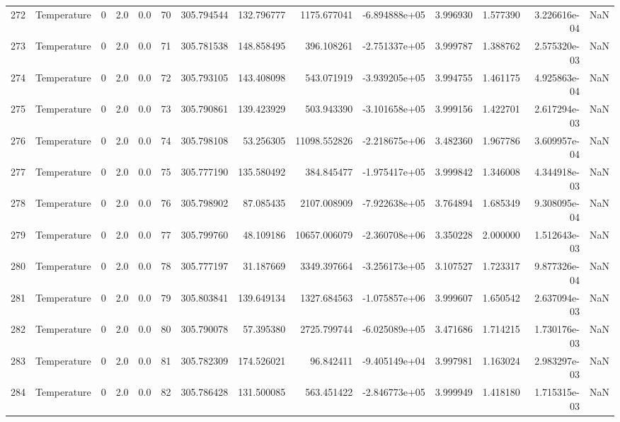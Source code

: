 \begin{tabular}{llrrrrrrrrrrrr}
272 &  Temperature &       0 &  2.0 &  0.0 &   70 &  305.794544 &   132.796777 &    1175.677041 & -6.894888e+05 &  3.996930 &  1.577390 &  3.226616e-04 &      NaN \\
273 &  Temperature &       0 &  2.0 &  0.0 &   71 &  305.781538 &   148.858495 &     396.108261 & -2.751337e+05 &  3.999787 &  1.388762 &  2.575320e-03 &      NaN \\
274 &  Temperature &       0 &  2.0 &  0.0 &   72 &  305.793105 &   143.408098 &     543.071919 & -3.939205e+05 &  3.994755 &  1.461175 &  4.925863e-04 &      NaN \\
275 &  Temperature &       0 &  2.0 &  0.0 &   73 &  305.790861 &   139.423929 &     503.943390 & -3.101658e+05 &  3.999156 &  1.422701 &  2.617294e-03 &      NaN \\
276 &  Temperature &       0 &  2.0 &  0.0 &   74 &  305.798108 &    53.256305 &   11098.552826 & -2.218675e+06 &  3.482360 &  1.967786 &  3.609957e-04 &      NaN \\
277 &  Temperature &       0 &  2.0 &  0.0 &   75 &  305.777190 &   135.580492 &     384.845477 & -1.975417e+05 &  3.999842 &  1.346008 &  4.344918e-03 &      NaN \\
278 &  Temperature &       0 &  2.0 &  0.0 &   76 &  305.798902 &    87.085435 &    2107.008909 & -7.922638e+05 &  3.764894 &  1.685349 &  9.308095e-04 &      NaN \\
279 &  Temperature &       0 &  2.0 &  0.0 &   77 &  305.799760 &    48.109186 &   10657.006079 & -2.360708e+06 &  3.350228 &  2.000000 &  1.512643e-03 &      NaN \\
280 &  Temperature &       0 &  2.0 &  0.0 &   78 &  305.777197 &    31.187669 &    3349.397664 & -3.256173e+05 &  3.107527 &  1.723317 &  9.877326e-04 &      NaN \\
281 &  Temperature &       0 &  2.0 &  0.0 &   79 &  305.803841 &   139.649134 &    1327.684563 & -1.075857e+06 &  3.999607 &  1.650542 &  2.637094e-03 &      NaN \\
282 &  Temperature &       0 &  2.0 &  0.0 &   80 &  305.790078 &    57.395380 &    2725.799744 & -6.025089e+05 &  3.471686 &  1.714215 &  1.730176e-03 &      NaN \\
283 &  Temperature &       0 &  2.0 &  0.0 &   81 &  305.782309 &   174.526021 &      96.842411 & -9.405149e+04 &  3.997981 &  1.163024 &  2.983297e-03 &      NaN \\
284 &  Temperature &       0 &  2.0 &  0.0 &   82 &  305.786428 &   131.500085 &     563.451422 & -2.846773e+05 &  3.999949 &  1.418180 &  1.715315e-03 &      NaN \\

\end{tabular}
